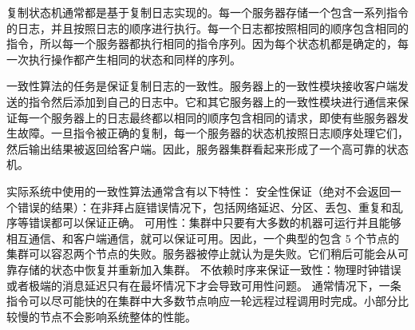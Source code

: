 复制状态机通常都是基于复制日志实现的。每一个服务器存储一个包含一系列指令的日志，并且按照日志的顺序进行执行。每一个日志都按照相同的顺序包含相同的指令，所以每一个服务器都执行相同的指令序列。因为每个状态机都是确定的，每一次执行操作都产生相同的状态和同样的序列。

一致性算法的任务是保证复制日志的一致性。服务器上的一致性模块接收客户端发送的指令然后添加到自己的日志中。它和其它服务器上的一致性模块进行通信来保证每一个服务器上的日志最终都以相同的顺序包含相同的请求，即使有些服务器发生故障。一旦指令被正确的复制，每一个服务器的状态机按照日志顺序处理它们，然后输出结果被返回给客户端。因此，服务器集群看起来形成了一个高可靠的状态机。

实际系统中使用的一致性算法通常含有以下特性：
安全性保证（绝对不会返回一个错误的结果）：在非拜占庭错误情况下，包括网络延迟、分区、丢包、重复和乱序等错误都可以保证正确。
可用性：集群中只要有大多数的机器可运行并且能够相互通信、和客户端通信，就可以保证可用。因此，一个典型的包含 5 个节点的集群可以容忍两个节点的失败。服务器被停止就认为是失败。它们稍后可能会从可靠存储的状态中恢复并重新加入集群。
不依赖时序来保证一致性：物理时钟错误或者极端的消息延迟只有在最坏情况下才会导致可用性问题。
通常情况下，一条指令可以尽可能快的在集群中大多数节点响应一轮远程过程调用时完成。小部分比较慢的节点不会影响系统整体的性能。







